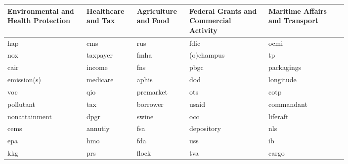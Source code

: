 \renewcommand{\arraystretch}{1.1}
\small
\centering
\begin{tabular}{p{0.2\linewidth}p{0.1\linewidth}p{0.1\linewidth}p{0.2\linewidth}p{0.2\linewidth}}
    \toprule
    \bfseries Environmental and Health Protection&\bfseries Healthcare and Tax&\bfseries Agriculture and Food&\bfseries Federal Grants and Commercial Activity&\bfseries Maritime Affairs and Transport\\
    \midrule
    hap             &cms       &rus         &fdic           &ocmi\\
    nox             &taxpayer  &fmha        &(o)champus     &tp\\
    cair            &income    &fns         &pbgc           &packagings\\
    emission(s)     &medicare  &aphis       &dod            &longitude\\
    voc             &qio       &premarket   &ots            &cotp\\
    pollutant       &tax       &borrower    &usaid          &commandant\\
    nonattainment   &dpgr      &swine       &occ            &liferaft\\
    cems            &annutiy   &fsa         &depository     &nls\\
    epa             &hmo       &fda         &uss            &ib\\
    kkg             &prs       &flock       &tva            &cargo\\
    \bottomrule
\end{tabular}
\vspace*{18pt}

